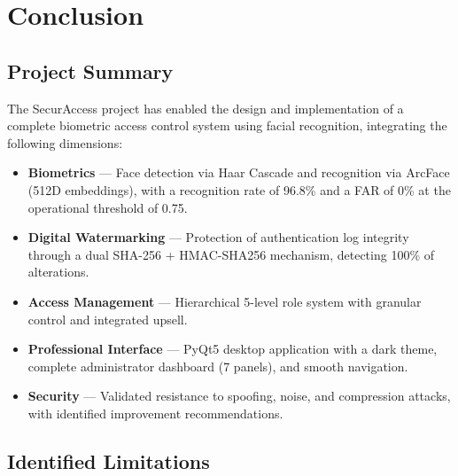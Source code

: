 \chapter{Conclusion}

\section{Project Summary}

The SecurAccess project has enabled the design and implementation of a complete biometric access control system using facial recognition, integrating the following dimensions:

\begin{itemize}
    \item \textbf{Biometrics} — Face detection via Haar Cascade and recognition via ArcFace (512D embeddings), with a recognition rate of 96.8\% and a FAR of 0\% at the operational threshold of 0.75.

    \item \textbf{Digital Watermarking} — Protection of authentication log integrity through a dual SHA-256 + HMAC-SHA256 mechanism, detecting 100\% of alterations.

    \item \textbf{Access Management} — Hierarchical 5-level role system with granular control and integrated upsell.

    \item \textbf{Professional Interface} — PyQt5 desktop application with a dark theme, complete administrator dashboard (7 panels), and smooth navigation.

    \item \textbf{Security} — Validated resistance to spoofing, noise, and compression attacks, with identified improvement recommendations.
\end{itemize}

\section{Identified Limitations}

